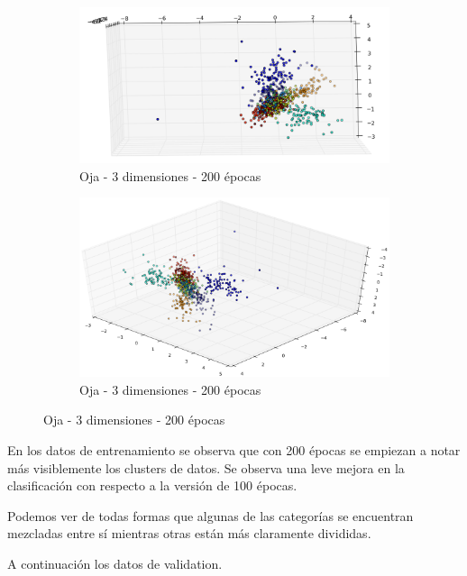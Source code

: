 \begin{figure}[!htbp]
\centering
\begin{subfigure}{.5\textwidth}
  \centering
  \includegraphics[width=1\linewidth, scale=1]{../img/ej1/oja/oja_3salida_200ep_train_3.png}
  \caption{Oja - 3 dimensiones - 200 épocas}
  \label{fig:sub3}
\end{subfigure}%
\begin{subfigure}{.5\textwidth}
  \centering
  \includegraphics[width=1\linewidth, scale=1]{../img/ej1/oja/oja_3salida_200ep_train_4.png}
  \caption{Oja - 3 dimensiones - 200 épocas}
  \label{fig:sub4}
\end{subfigure}
\end{figure}

En los datos de entrenamiento se observa que con 200 épocas se empiezan a notar más visiblemente
los clusters de datos. Se observa una leve mejora en la clasificación con respecto a la versión de 100 épocas.

Podemos ver de todas formas que algunas de las categorías se encuentran mezcladas entre sí mientras otras están más claramente divididas.

A continuación los datos de validation.

